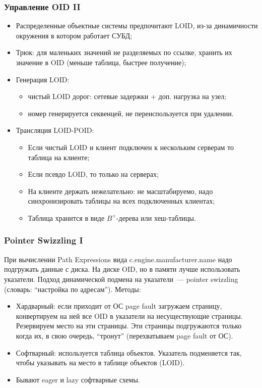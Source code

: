 \documentclass{beamer}
\begin{document}
\begin{frame}
\frametitle{Управление OID II}

\begin{itemize}
 \setlength\itemsep{1em}
  \item Распределенные объектные системы предпочитают LOID, из-за динамичности окружения в котором работает СУБД;
  \item Трюк: для маленьких значений не разделяемых по ссылке, хранить их значение в OID (меньше таблица, быстрее получение);
  \item Генерация LOID: 
  \begin{itemize}
    \item чистый LOID дорог: сетевые задержки + доп. нагрузка на узел;
    \item номер генерируется секвенцей, не переиспользуется при удалении.
  \end{itemize}
  \item Трансляция LOID-POID: 
  \begin{itemize}
    \item Если чистый LOID и клиент подключен к нескольким серверам то таблица на клиенте;
    \item Если псевдо LOID, то только на серверах;
    \item На клиенте держать нежелательно: не масштабируемо, надо синхронизировать таблицы на всех подключенных клиентах;
    \item Таблица хранится в виде $B^+$-дерева или хеш-таблицы.
  \end{itemize}  
\end{itemize}
\end{frame}

\begin{frame}
\frametitle{Pointer Swizzling I}

При вычислении Path Expressions вида c.engine.manufacturer.name надо подгружать данные с диска. На диске OID, но в памяти лучше использовать указатели. Подход динамической подмена на указатели~--- pointer swizzling (словарь: ``настройка по адресам''). Методы:

\begin{itemize}
 \setlength\itemsep{1em}
  \item Хардварный: если приходит от ОС page fault загружаем страницу, конвертируем на ней все OID в указатели на несуществующие страницы. Резервируем место на эти страницы. Эти страницы подгружаются только когда их, в свою очередь, ``тронут'' (перехватываем page fault от ОС).
  \item Софтварный: используется таблица объектов. Указатель подменяется так, чтобы указывать на место в таблице объектов (LOID).
  \item Бывают eager и lazy софтварные схемы.
\end{itemize}
\end{frame}
\end{document}
